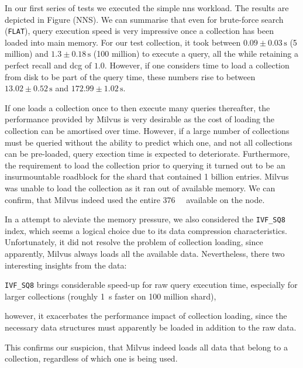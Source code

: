 In our first series of tests we executed the simple \acrshort{nns} workload. The results are depicted in Figure  (NNS). We can summarise that even for brute-force search (\texttt{FLAT}), query execution speed is very impressive once a collection has been loaded into main memory. For our test collection, it took between $0.09 \pm 0.03 \, \si{\second}$ (5 million) and $1.3 \pm 0.18 \, \si{\second}$ (100 million) to execute a query, all the while retaining a perfect recall and \acrshort{dcg} of $1.0$. However, if one considers time to load a collection from disk to be part of the query time, these numbers rise to between $13.02 \pm 0.52 \, \si{\second}$ and $172.99 \pm 1.02 \, \si{\second}$.

If one loads a collection once to then execute many queries thereafter, the performance provided by Milvus is very desirable as the cost of loading the collection can be amortised over time. However, if a large number of collections must be queried without the ability to predict which one, and not all collections can be pre-loaded, query exection time is expected to deteriorate. Furthermore, the requirement to load the collection prior to querying it turned out to be an insurmountable roadblock for the shard that contained 1 billion entries. Milvus was unable to load the collection as it ran out of available memory. We can confirm, that Milvus indeed used the entire \SI{376}{\giga\byte} available on the node.

In a attempt to aleviate the memory pressure, we also considered the \texttt{IVF\_SQ8} index, which seems a logical choice due to its data compression characteristics. Unfortunately, it did not resolve the problem of collection loading, since apparently, Milvus always loads all the available data. Nevertheless, there two interesting insights from the data:
\begin{enumerate*}[label=(\roman*)]
    \item \texttt{IVF\_SQ8} brings considerable speed-up for raw query execution time, especially for larger collections (roughly \SI{1}{\second} faster on 100 million shard),
    \item however, it exacerbates the performance impact of collection loading, since the necessary data structures must apparently be loaded in addition to the raw data.
\end{enumerate*} This confirms our suspicion, that Milvus indeed loads all data that belong to a collection, regardless of which one is being used.

